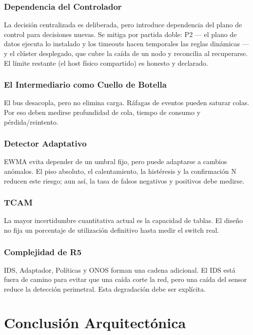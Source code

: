 \documentclass[11pt,a4paper]{report}
\begin{document}
\subsection{Dependencia del Controlador}
La decisión centralizada es deliberada, pero introduce dependencia del plano de control para decisiones nuevas. Se mitiga por partida doble: P2 — el plano de datos ejecuta lo instalado y los timeouts hacen temporales las reglas dinámicas — y el clúster desplegado, que cubre la caída de un nodo y reconcilia al recuperarse. El límite restante (el host físico compartido) es honesto y declarado.

\subsection{El Intermediario como Cuello de Botella}
El bus desacopla, pero no elimina carga. Ráfagas de eventos pueden saturar colas. Por eso deben medirse profundidad de cola, tiempo de consumo y pérdida/reintento.

\subsection{Detector Adaptativo}
EWMA evita depender de un umbral fijo, pero puede adaptarse a cambios anómalos. El piso absoluto, el calentamiento, la histéresis y la confirmación N reducen este riesgo; aun así, la tasa de falsos negativos y positivos debe medirse.

\subsection{TCAM}
La mayor incertidumbre cuantitativa actual es la capacidad de tablas. El diseño no fija un porcentaje de utilización definitivo hasta medir el switch real.

\subsection{Complejidad de R5}
IDS, Adaptador, Políticas y ONOS forman una cadena adicional. El IDS está fuera de camino para evitar que una caída corte la red, pero una caída del sensor reduce la detección perimetral. Esta degradación debe ser explícita.

\chapter*{Conclusión Arquitectónica}
\end{document}
